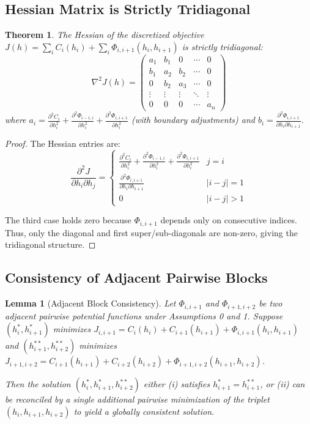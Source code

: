 \documentclass[12pt]{article}
\newtheorem{theorem}{Theorem}[section]
\newtheorem{lemma}{Lemma}[section]
\theoremstyle{definition}
\begin{document}
\subsection{Hessian Matrix is Strictly Tridiagonal}

\begin{theorem}
The Hessian of the discretized objective $J(h) = \sum_i C_i(h_i) + \sum_i \Phi_{i,i+1}(h_i, h_{i+1})$ is strictly tridiagonal:
\[
\nabla^2 J(h) = \begin{pmatrix}
a_1 & b_1 & 0 & \cdots & 0 \\
b_1 & a_2 & b_2 & \cdots & 0 \\
0 & b_2 & a_3 & \cdots & 0 \\
\vdots & \vdots & \vdots & \ddots & \vdots \\
0 & 0 & 0 & \cdots & a_n
\end{pmatrix}
\]
where $a_i = \frac{\partial^2 C_i}{\partial h_i^2} + \frac{\partial^2 \Phi_{i-1,i}}{\partial h_i^2} + \frac{\partial^2 \Phi_{i,i+1}}{\partial h_i^2}$ (with boundary adjustments) and $b_i = \frac{\partial^2 \Phi_{i,i+1}}{\partial h_i \partial h_{i+1}}$.
\end{theorem}

\begin{proof}
The Hessian entries are:
\[
\frac{\partial^2 J}{\partial h_i \partial h_j} = \begin{cases}
\frac{\partial^2 C_i}{\partial h_i^2} + \frac{\partial^2 \Phi_{i-1,i}}{\partial h_i^2} + \frac{\partial^2 \Phi_{i,i+1}}{\partial h_i^2} & j=i \\
\frac{\partial^2 \Phi_{i,i+1}}{\partial h_i \partial h_{i+1}} & |i-j|=1 \\
0 & |i-j|>1
\end{cases}
\]

The third case holds zero because $\Phi_{i,i+1}$ depends only on consecutive indices. Thus, only the diagonal and first super/sub-diagonals are non-zero, giving the tridiagonal structure.
\end{proof}

\subsection{Consistency of Adjacent Pairwise Blocks}

\begin{lemma}[Adjacent Block Consistency]
\label{lem:adjacent_consistency}
Let $\Phi_{i,i+1}$ and $\Phi_{i+1,i+2}$ be two adjacent pairwise potential functions under Assumptions 0 and 1. Suppose $(h_i^*, h_{i+1}^*)$ minimizes $J_{i,i+1} = C_i(h_i) + C_{i+1}(h_{i+1}) + \Phi_{i,i+1}(h_i, h_{i+1})$ and $(h_{i+1}^{**}, h_{i+2}^{**})$ minimizes $J_{i+1,i+2} = C_{i+1}(h_{i+1}) + C_{i+2}(h_{i+2}) + \Phi_{i+1,i+2}(h_{i+1}, h_{i+2})$.

Then the solution $(h_i^*, h_{i+1}^*, h_{i+2}^{**})$ either (i) satisfies $h_{i+1}^* = h_{i+1}^{**}$, or (ii) can be reconciled by a single additional pairwise minimization of the triplet $(h_i, h_{i+1}, h_{i+2})$ to yield a globally consistent solution.
\end{lemma}
\end{document}
